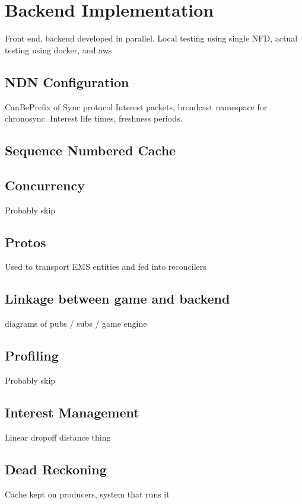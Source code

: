 \chapter{Backend Implementation}
Front end, backend developed in parallel. Local testing using single NFD, actual testing using docker, and aws

\section{NDN Configuration}
CanBePrefix of Sync protocol Interest packets, broadcast namespace for chronosync. Interest life times, freshness periods.

\section{Sequence Numbered Cache}


\section{Concurrency}
Probably skip


\section{Protos}\label{sec:impl:proto}
Used to transport EMS entities and fed into reconcilers

\section{Linkage between game and backend}
diagrams of pubs / subs / game engine


\section{Profiling}
Probably skip

\section{Interest Management}\label{sec:impl:im}
Linear dropoff distance thing

\section{Dead Reckoning}\label{sec:des:dr}
Cache kept on producers, system that runs it

